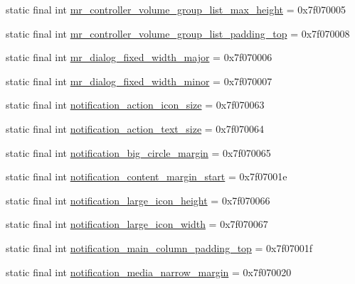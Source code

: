 \begin{CompactItemize}
\item 
static final int \hyperlink{classandroid_1_1support_1_1coreutils_1_1_r_1_1dimen_3f150dda82c6995b007408c055479eed}{mr\_\-controller\_\-volume\_\-group\_\-list\_\-max\_\-height} = 0x7f070005
\item 
static final int \hyperlink{classandroid_1_1support_1_1coreutils_1_1_r_1_1dimen_a57e8a72e08c93bf658047db7c732339}{mr\_\-controller\_\-volume\_\-group\_\-list\_\-padding\_\-top} = 0x7f070008
\item 
static final int \hyperlink{classandroid_1_1support_1_1coreutils_1_1_r_1_1dimen_7ecd9380389e9042a23de890502bf5b7}{mr\_\-dialog\_\-fixed\_\-width\_\-major} = 0x7f070006
\item 
static final int \hyperlink{classandroid_1_1support_1_1coreutils_1_1_r_1_1dimen_f806dc925c5f382d5b4de4a7c84bc799}{mr\_\-dialog\_\-fixed\_\-width\_\-minor} = 0x7f070007
\item 
static final int \hyperlink{classandroid_1_1support_1_1coreutils_1_1_r_1_1dimen_5f25f7b380ab25f4015f60569826981f}{notification\_\-action\_\-icon\_\-size} = 0x7f070063
\item 
static final int \hyperlink{classandroid_1_1support_1_1coreutils_1_1_r_1_1dimen_7bb769bdd5f836319c95d780c2410eb9}{notification\_\-action\_\-text\_\-size} = 0x7f070064
\item 
static final int \hyperlink{classandroid_1_1support_1_1coreutils_1_1_r_1_1dimen_419382fca50f8bf9f339e2efe57655b7}{notification\_\-big\_\-circle\_\-margin} = 0x7f070065
\item 
static final int \hyperlink{classandroid_1_1support_1_1coreutils_1_1_r_1_1dimen_b333d09c78fcbbba74c46140a45cdbef}{notification\_\-content\_\-margin\_\-start} = 0x7f07001e
\item 
static final int \hyperlink{classandroid_1_1support_1_1coreutils_1_1_r_1_1dimen_c7d86c7a8004fa218c12bb3648a2dac1}{notification\_\-large\_\-icon\_\-height} = 0x7f070066
\item 
static final int \hyperlink{classandroid_1_1support_1_1coreutils_1_1_r_1_1dimen_571968613c902ff8cd8dfe2ccde347f6}{notification\_\-large\_\-icon\_\-width} = 0x7f070067
\item 
static final int \hyperlink{classandroid_1_1support_1_1coreutils_1_1_r_1_1dimen_ffc128fceb1d82cb58dcb5fbb8b74700}{notification\_\-main\_\-column\_\-padding\_\-top} = 0x7f07001f
\item 
static final int \hyperlink{classandroid_1_1support_1_1coreutils_1_1_r_1_1dimen_00bd2394c38182b34f39203e70bd23f3}{notification\_\-media\_\-narrow\_\-margin} = 0x7f070020

\end{CompactItemize}
